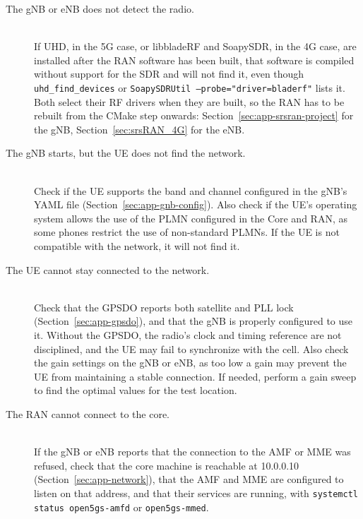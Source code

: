 \begin{description}
    \item[The \gls{gNB} or \gls{eNB} does not detect the radio.]~\\
    If UHD, in the 5G case, or libbladeRF and SoapySDR, in the 4G case, are installed after the \gls{RAN} software has been built, that software is compiled without support for the \gls{SDR} and will not find it, even though \texttt{uhd\_find\_devices} or \texttt{SoapySDRUtil --probe="driver=bladerf"} lists it. Both select their \gls{RF} drivers when they are built, so the \gls{RAN} has to be rebuilt from the CMake step onwards: Section~\ref{sec:app-srsran-project} for the \gls{gNB}, Section~\ref{sec:srsRAN_4G} for the \gls{eNB}.

    \item[The \gls{gNB} starts, but the \gls{UE} does not find the network.]~\\
    Check if the \gls{UE} supports the band and channel configured in the \gls{gNB}'s YAML file (Section~\ref{sec:app-gnb-config}). Also check if the \gls{UE}'s operating system allows the use of the \gls{PLMN} configured in the Core and \gls{RAN}, as some phones restrict the use of non-standard PLMNs. If the \gls{UE} is not compatible with the network, it will not find it.

    \item[The \gls{UE} cannot stay connected to the network.]~\\
    Check that the \gls{GPSDO} reports both satellite and PLL lock (Section~\ref{sec:app-gpsdo}), and that the \gls{gNB} is properly configured to use it. Without the \gls{GPSDO}, the radio's clock and timing reference are not disciplined, and the \gls{UE} may fail to synchronize with the cell. Also check the gain settings on the \gls{gNB} or \gls{eNB}, as too low a gain may prevent the \gls{UE} from maintaining a stable connection. If needed, perform a gain sweep to find the optimal values for the test location.

    \item[The \gls{RAN} cannot connect to the core.]~\\
    If the \gls{gNB} or \gls{eNB} reports that the connection to the \gls{AMF} or \gls{MME} was refused, check that the core machine is reachable at 10.0.0.10 (Section~\ref{sec:app-network}), that the \gls{AMF} and \gls{MME} are configured to listen on that address, and that their services are running, with \texttt{systemctl status open5gs-amfd} or \texttt{open5gs-mmed}.


\end{description}
